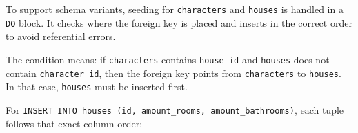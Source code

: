 To support schema variants, seeding for \texttt{characters} and
\texttt{houses} is handled in a \texttt{DO} block. It checks where the
foreign key is placed and inserts in the correct order to avoid
referential errors.

\begin{Shaded}
\begin{Highlighting}[]
 
     
\NormalTok{        (}\NormalTok{, }\NormalTok{, }\NormalTok{), (}\NormalTok{, }\NormalTok{, }\NormalTok{), (}\NormalTok{, }\NormalTok{, }\NormalTok{);}

     
\NormalTok{    ) }
\NormalTok{        (}\NormalTok{, }\NormalTok{, }\NormalTok{, }\NormalTok{, }\NormalTok{, }\NormalTok{, }\NormalTok{, }\NormalTok{, }\NormalTok{, }\NormalTok{),}
\NormalTok{        (}\NormalTok{, }\NormalTok{, }\NormalTok{, }\NormalTok{, }\NormalTok{, }\NormalTok{, }\NormalTok{, }\NormalTok{, }\NormalTok{, }\NormalTok{);}
 \NormalTok{;}
\end{Highlighting}
\end{Shaded}

The condition means: if \texttt{characters} contains \texttt{house\_id}
and \texttt{houses} does not contain \texttt{character\_id}, then the
foreign key points from \texttt{characters} to \texttt{houses}. In that
case, \texttt{houses} must be inserted first.

For
\texttt{INSERT\ INTO\ houses\ (id,\ amount\_rooms,\ amount\_bathrooms)},
each tuple follows that exact column order:

